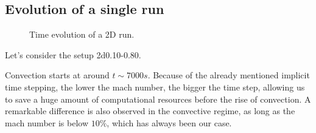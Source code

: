 \subsection{Evolution of a single run}
\begin{figure}[t!]
      \centering
     \centering
	\hfill
	\caption{Time evolution of a 2D run.}
	\label{2dsingle}
\end{figure}
Let's consider the setup 2d0.10-0.80. 

Convection starts at around $t \sim 7000 s$. Because of the already mentioned implicit time stepping, the lower the mach number, the bigger the time step, allowing us to save a huge amount of computational resources before the rise of convection. A remarkable difference is also observed in the convective regime, as long as the mach number is below $10 \%$, which has always been our case.


